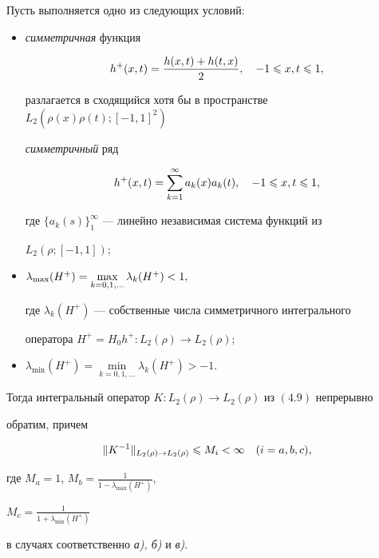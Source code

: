 \begin{lem}


Пусть выполняется одно из следующих условий\/${:}$


\begin{itemize}


\item[а)] {\em симметричная} функция


$$


h^+(x,t)=\frac{h(x,t)+h(t,x)}{2}, \quad -1\lea x,t \lea 1,


$$


разлагается в сходящийся хотя бы в пространстве $L_2(\rho(x)\rho(t);[-1,1]^2)$


{\em симметричный} ряд


\begin{equation}


h^+(x,t)=\sum_{k=1}^\infty a_k(x)a_k(t),\quad -1\lea x,t\lea 1,


\end{equation}


где $\{a_k(s)\}_1^\infty$ --- линейно независимая система функций из 


$L_2(\rho;[-1,1]);$


\item[б)] $\lambda_{\max}(H^+)=\max\limits_{k=0,1,\dotsc}\lambda_k (H^+)<1,$


где $\lambda_k(H^+)$ --- собственные числа симметричного интегрального 


оператора $H^+=H_0h^+:L_2(\rho)\to L_2(\rho);$


\item[в)] $\lambda_{\min}(H^+)=\min\limits_{k=0,1,\dotsc}\lambda_k(H^+)>-1$.


\end{itemize}





Тогда интегральный оператор $K:L_2(\rho)\to L_2(\rho)$ из $(4.9)$ непрерывно 


обратим, причем


\begin{equation}


\|K^{-1}\|_{L_2(\rho)\to L_2(\rho)}\lea M_i<\infty


\quad (i=a,b,c),


\end{equation}


где $M_a=1$, $M_b=\frac{1}{1-\lambda_{\max}(H^+)}$,


$M_c=\frac{1}{1+\lambda_{\min}(H^+)}$


в случаях соответственно {\em а), б)} и {\em в)}.


\end{lem}








